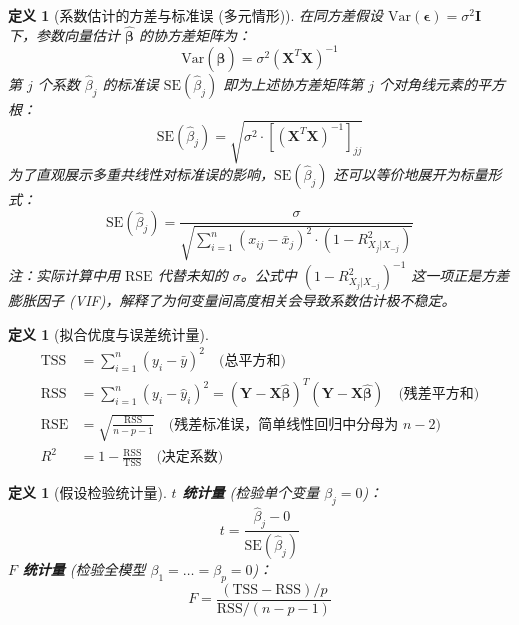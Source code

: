 \documentclass[UTF8]{ctexart}
\newtheorem{definition}[theorem]{定义}
\numberwithin{equation}{section}
\newcommand{\Var}{\text{Var}}
\newcommand{\SE}{\text{SE}}
\newcommand{\RSS}{\text{RSS}}
\newcommand{\TSS}{\text{TSS}}
\newcommand{\RSE}{\text{RSE}}
\begin{document}
\begin{definition}[系数估计的方差与标准误 (多元情形)]
在同方差假设 $\Var(\boldsymbol{\epsilon}) = \sigma^2 \mathbf{I}$ 下，参数向量估计 $\hat{\boldsymbol{\beta}}$ 的协方差矩阵为：
\begin{equation}
\Var(\hat{\boldsymbol{\beta}}) = \sigma^2 (\mathbf{X}^T\mathbf{X})^{-1}
\end{equation}
第 $j$ 个系数 $\hat{\beta}_j$ 的标准误 $\SE(\hat{\beta}_j)$ 即为上述协方差矩阵第 $j$ 个对角线元素的平方根：
\begin{equation}
\SE(\hat{\beta}_j) = \sqrt{\sigma^2 \cdot \left[ (\mathbf{X}^T\mathbf{X})^{-1} \right]_{jj}}
\end{equation}
为了直观展示多重共线性对标准误的影响，$\SE(\hat{\beta}_j)$ 还可以等价地展开为标量形式：
\begin{equation}
\SE(\hat{\beta}_j) = \frac{\sigma}{\sqrt{\sum_{i=1}^n (x_{ij} - \bar{x}_j)^2 \cdot (1 - R_{X_j | X_{-j}}^2)}}
\end{equation}
\emph{注：实际计算中用 $\RSE$ 代替未知的 $\sigma$。公式中 $(1 - R_{X_j | X_{-j}}^2)^{-1}$ 这一项正是方差膨胀因子 (VIF)，解释了为何变量间高度相关会导致系数估计极不稳定。}
\end{definition}

\begin{definition}[拟合优度与误差统计量]
\begin{align}
\TSS &= \sum_{i=1}^n (y_i - \bar{y})^2 \quad \text{(总平方和)} \\
\RSS &= \sum_{i=1}^n (y_i - \hat{y}_i)^2 = (\mathbf{Y} - \mathbf{X}\hat{\boldsymbol{\beta}})^T (\mathbf{Y} - \mathbf{X}\hat{\boldsymbol{\beta}}) \quad \text{(残差平方和)} \\
\RSE &= \sqrt{\frac{\RSS}{n - p - 1}} \quad \text{(残差标准误，简单线性回归中分母为 $n-2$)} \\
R^2 &= 1 - \frac{\RSS}{\TSS} \quad \text{(决定系数)}
\end{align}
\end{definition}

\begin{definition}[假设检验统计量]
\textbf{$t$ 统计量} (检验单个变量 $\beta_j = 0$)：
\begin{equation}
t = \frac{\hat{\beta}_j - 0}{\SE(\hat{\beta}_j)}
\end{equation}
\textbf{$F$ 统计量} (检验全模型 $\beta_1 = \dots = \beta_p = 0$)：
\begin{equation}
F = \frac{(\TSS - \RSS) / p}{\RSS / (n - p - 1)}
\end{equation}
\end{definition}
\end{document}
